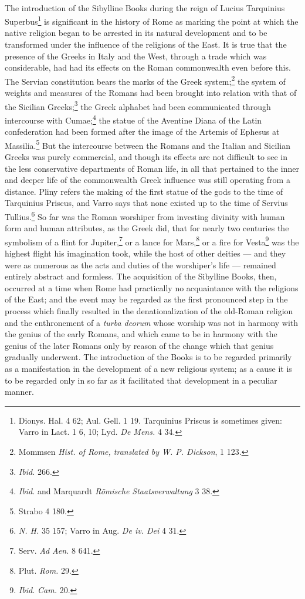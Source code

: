 \documentclass[a4paper, 11pt, oneside, polutonikogreek, french]{article}
\begin{document}
\paragraph{}
The introduction of the Sibylline Books during the reign of Lucius Tarquinius Superbus\footnote{Dionys. Hal. 4 62; Aul. Gell. 1 19. Tarquinius Priscus is sometimes given: Varro in Lact. 1 6, 10; Lyd. \emph{De Mens.} 4 34.} is significant in the history of Rome as marking the point at which the native religion began to be arrested in its natural development and to be transformed under the influence of the religions of the East. It is true that the presence of the Greeks in Italy and the West, through a trade which was considerable, had had its effects on the Roman commonwealth even before this. The Servian constitution bears the marks of the Greek system;\footnote{Mommsen \emph{Hist. of Rome, translated by W. P. Dickson}, 1 123.} the system of weights and measures of the Romans had been brought into relation with that of the Sicilian Greeks;\footnote{\emph{Ibid.} 266.} the Greek alphabet had been communicated through intercourse with Cumae;\footnote{\emph{Ibid.} and Marquardt \emph{Römische Staatsverwaltung} 3 38.} the statue of the Aventine Diana of the Latin confederation had been formed after the image of the Artemis of Ephesus at Massilia.\footnote{Strabo 4 180.} But the intercourse between the Romans and the Italian and Sicilian Greeks was purely commercial, and though its effects are not difficult to see in the less conservative departments of Roman life, in all that pertained to the inner and deeper life of the commonwealth Greek influence was still operating from a distance. Pliny refers the making of the first statue of the gods to the time of Tarquinius Priscus, and Varro says that none existed up to the time of Servius Tullius.\footnote{\emph{N. H.} 35 157; Varro in Aug. \emph{De iv. Dei} 4 31.} So far was the Roman worshiper from investing divinity with human form and human attributes, as the Greek did, that for nearly two centuries the symbolism of a flint for Jupiter,\footnote{Serv. \emph{Ad Aen.} 8 641.} or a lance for Mars,\footnote{Plut. \emph{Rom.} 29.} or a fire for Vesta\footnote{\emph{Ibid.} \emph{Cam.} 20.} was the highest flight his imagination took, while the host of other deities --- and they were as numerous as the acts and duties of the worshiper's life --- remained entirely abstract and formless. The acquisition of the Sibylline Books, then, occurred at a time when Rome had practically no acquaintance with the religions of the East; and the event may be regarded as the first pronounced step in the process which finally resulted in the denationalization of the old-Roman religion and the enthronement of a \emph{turba deorum} whose worship was not in harmony with the genius of the early Romans, and which came to be in harmony with the genius of the later Romans only by reason of the change which that genius gradually underwent. The introduction of the Books is to be regarded primarily as a manifestation in the development of a new religious system; as a cause it is to be regarded only in so far as it facilitated that development in a peculiar manner.
\end{document}
